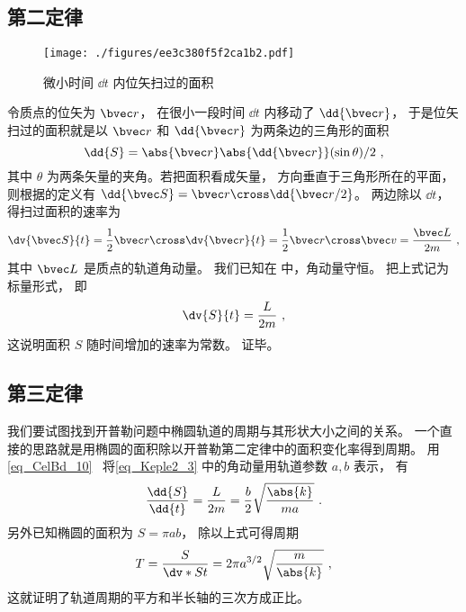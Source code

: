 

\subsection{第二定律}
\begin{figure}[ht]
\centering
\texttt{[image: ./figures/ee3c380f5f2ca1b2.pdf]}
\caption{微小时间 $\dd{t}$ 内位矢扫过的面积} \label{fig_Keple2_1}
\end{figure}

令质点的位矢为 $\bvec r$，  在很小一段时间 $\dd{t}$ 内移动了 $\dd{\bvec r}$，  于是位矢扫过的面积就是以 $\bvec r$ 和 $\dd{\bvec r}$ 为两条边的三角形的面积
\begin{equation}
\dd{S} = \abs{\bvec r} \abs{\dd{\bvec r}} (\sin \theta) /2~,
\end{equation}
其中 $\theta$ 为两条矢量的夹角。若把面积看成矢量， 方向垂直于三角形所在的平面， 则根据的定义有 $\dd{\bvec S} = \bvec r \cross \dd{\bvec r/2}$。 两边除以 $\dd{t}$，  得扫过面积的速率为
\begin{equation}
\dv{\bvec S}{t} = \frac12 \bvec r \cross \dv{\bvec r}{t} = \frac12 \bvec r\cross \bvec v = \frac{\bvec L}{2m}~,
\end{equation}
其中 $\bvec L$ 是质点的轨道角动量。 我们已知在 中，角动量守恒。 把上式记为标量形式， 即
\begin{equation}\label{eq_Keple2_3}
\dv{S}{t} = \frac{L}{2m}~,
\end{equation}
这说明面积 $S$ 随时间增加的速率为常数。 证毕。

\subsection{第三定律}
我们要试图找到开普勒问题中椭圆轨道的周期与其形状大小之间的关系。 一个直接的思路就是用椭圆的面积除以开普勒第二定律中的面积变化率得到周期。 用\autoref{eq_CelBd_10}~ 将\autoref{eq_Keple2_3} 中的角动量用轨道参数 $a,b$ 表示， 有
\begin{equation}
\frac{\dd{S}}{\dd{t}} = \frac{L}{2m} = \frac b2 \sqrt{\frac{\abs{k}}{ma}}~.
\end{equation}
另外已知椭圆的面积为 $S = \pi ab$， 除以上式可得周期
\begin{equation}\label{eq_Keple2_1}
T = \frac{S}{\dv*{S}{t}} = 2\pi a^{3/2} \sqrt{\frac{m}{\abs{k}}}~,
\end{equation}
这就证明了轨道周期的平方和半长轴的三次方成正比。
